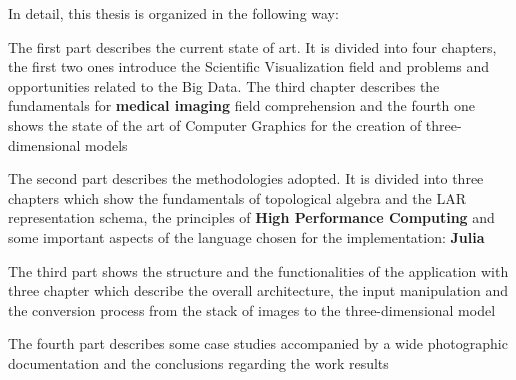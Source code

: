 In detail, this thesis is organized in the following way:
\begin{description}
 \item The first part describes the current state of art. It is divided into four chapters, the first two ones introduce the Scientific Visualization field and problems and opportunities related to the Big Data. The third chapter describes the fundamentals for \textbf{medical imaging} field comprehension and the fourth one shows the state of the art of Computer Graphics for the creation of three-dimensional models
 \item The second part describes the methodologies adopted. It is divided into three chapters which show the fundamentals of topological algebra and the LAR representation schema, the principles of \textbf{High Performance Computing} and some important aspects of the language chosen for the implementation: \textbf{Julia}
 \item The third part shows the structure and the functionalities of the application with three chapter which describe the overall architecture, the input manipulation and the conversion process from the stack of images to the three-dimensional model
 \item The fourth part describes some case studies accompanied by a wide photographic documentation and the conclusions regarding the work results
\end{description}
